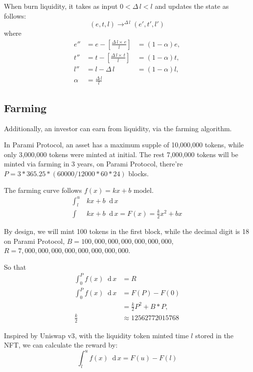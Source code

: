 \documentclass[twoside,twocolumn]{article}
\newcommand*\diff{\mathop{}\!\mathrm{d}}
\begin{document}
When burn liquidity,
it takes as input $0<\Delta\,l<l$ and updates the state as follows:
\[
    (e,t,l)\mathop{\to}^{\Delta\,l}({e}',{t}',{l}')
\]
where
\begin{align*}
    {e}''  & = e-\left[\frac{\Delta\,l\times\,e}{l}\right] & =(1-\alpha)e, \\
    {t}''  & = t-\left[\frac{\Delta\,l\times\,t}{l}\right] & =(1-\alpha)t, \\
    {l}''  & =l-\Delta\,l                                  & =(1-\alpha)l, \\
    \alpha & =\frac{\Delta\,l}{l}
\end{align*}

\subsection{Farming}

Additionally, an investor can earn from liquidity,
via the farming algorithm.

In Parami Protocol, an asset has a maximum supple of 10,000,000 tokens,
while only 3,000,000 tokens were minted at initial.
The rest 7,000,000 tokens will be minted via farming in 3 years,
on Parami Protocol, there're $P=3*365.25*(60000/12000*60*24)$ blocks.

The farming curve follows $f(x)=kx+b$ model.
\begin{align*}
    \int_{l}^{u}\, & kx+b\diff\,x                        \\
    \int\,         & kx+b\diff\,x=F(x)=\frac{k}{2}x^2+bx
\end{align*}

By design, we will mint 100 tokens in the first block,
while the decimal digit is 18 on Parami Protocol,
$B=100,000,000,000,000,000,000$, $R=7,000,000,000,000,000,000,000,000$.

So that
\begin{align*}
    \int_{0}^{P}f(x)\diff\,x & =R                    \\
    \int_{0}^{P}f(x)\diff\,x & =F(P)-F(0)            \\
                             & =\frac{k}{2}P^2+B*P,  \\
    \frac{k}{2}              & \approx12562772015768
\end{align*}

Inspired by Uniswap v3\cite{ref4}, with the liquidity token minted time $l$ stored in the NFT,
we can calculate the reward by:
\[
    \int_{l}^{u}f(x)\diff\,x=F(u)-F(l)
\]
\end{document}
